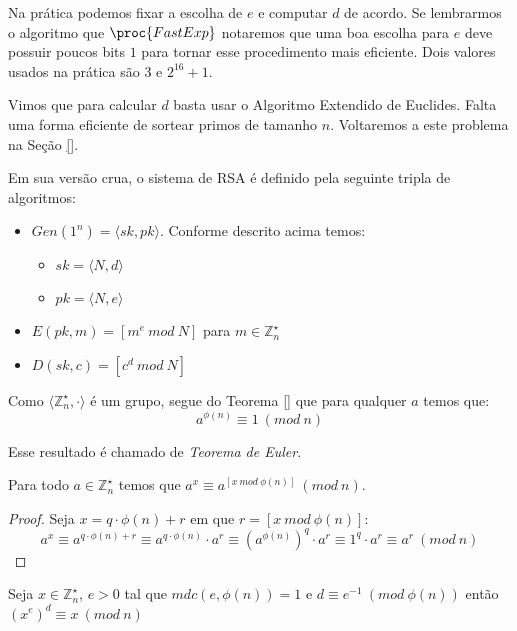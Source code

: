 Na prática podemos fixar a escolha de $e$ e computar $d$ de acordo.
Se lembrarmos o algoritmo que $\proc{FastExp}$ notaremos que uma boa escolha para $e$ deve possuir poucos bits $1$ para tornar esse procedimento mais eficiente.
Dois valores usados na prática são $3$ e $2^{16}+1$.

Vimos que para calcular $d$ basta usar o Algoritmo Extendido de Euclides.
Falta uma forma eficiente de sortear primos de tamanho $n$.
Voltaremos a este problema na Seção \ref{}.

Em sua versão crua, o sistema de RSA é definido pela seguinte tripla de algoritmos:

\begin{itemize}
\item $Gen(1^n) = \langle sk, pk \rangle$. Conforme descrito acima temos:
\begin{itemize}
\item $sk = \langle N, d \rangle$
\item $pk = \langle N, e \rangle$ 
\end{itemize}
\item $E(pk, m) = [m^e\ mod\ N]$ para $m \in \mathbb{Z}_n^\star$
\item $D(sk, c) = [c^d\ mod\ N]$
\end{itemize}

Como $\langle \mathbb{Z}_n^\star, \cdot \rangle$ é um grupo, segue do Teorema \ref{} que para qualquer $a$ temos que:
\begin{displaymath}
  a^{\phi(n)} \equiv 1\ (mod\ n)
\end{displaymath}

Esse resultado é chamado de {\em Teorema de Euler}.

\begin{corollary}
  Para todo $a \in \mathbb{Z}_n^\star$ temos que $a^x \equiv a^{[x\ mod\ \phi(n)]}\ (mod\ n)$.
\end{corollary}
\begin{proof}
  Seja $x = q \cdot \phi(n) + r$ em que $r = [x\ mod\ \phi(n)]$:
  \begin{displaymath}
    a^x \equiv a^{q \cdot \phi(n) + r} \equiv a^{q \cdot \phi(n)} \cdot a^r \equiv (a^{\phi(n)})^q \cdot a^r \equiv 1^q \cdot a^r \equiv a^r\ (mod\ n)
  \end{displaymath}
\end{proof}


\begin{corollary}
Seja $x \in \mathbb{Z}_n^\star$, $e > 0$ tal que $mdc(e, \phi(n)) = 1$ e $d \equiv e^{-1}\ (mod\ \phi(n))$ então $(x^e)^d \equiv x\ (mod\ n)$
\end{corollary}

